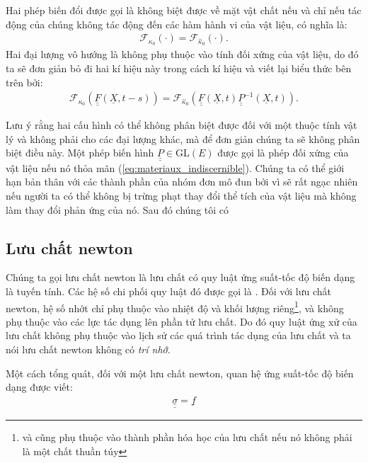 \documentclass[../../../main.tex]{subfiles}
\begin{document}
	Hai phép biến đổi được gọi là không biệt được về mặt vật chất nếu và chỉ nếu tác động của chúng không tác động đến các hàm hành vi của vật liệu, có nghĩa là:
		\begin{align}\label{eq:materiaux_indiscernible}
			\mathcal{F}_{\kappa_0}\left(\cdot\right)=\mathcal{F}_{\widehat{\kappa}_0}\left(\cdot\right).
		\end{align}
	Hai đại lượng vô hướng là không phụ thuộc vào tính đối xứng của vật liệu, do đó ta sẽ đơn giản bỏ đi hai kí hiệu này trong cách kí hiệu và viết lại biểu thức bên trên bởi:
		\begin{equation}
			\begin{aligned}
				\mathcal{F}_{\kappa_0}\left(\underline{\underline{F}}\left(\underline{X},t-s\right)\right)=\mathcal{F}_{\widehat{\kappa}_0}\left(\underline{\underline{F}}\left(\underline{X},t\right)\underline{\underline{P}}^{-1}\left(\underline{X},t\right)\right).
			\end{aligned}
		\end{equation}

	Lưu ý rằng hai cấu hình có thể không phân biệt được đối với một thuộc tính vật lý và không phải cho các đại lượng khác, mà để đơn giản chúng ta sẽ không phân biệt điều này. Một phép biến hình $\underline{\underline{P}}\in\text{GL}(E)$ được gọi là phép đối xứng của vật liệu nếu nó thỏa mãn (\ref{eq:materiaux_indiscernible}). Chúng ta có thể giới hạn bản thân với các thành phần của nhóm đơn mô đun bởi vì sẽ rất ngạc nhiên nếu người ta có thể không bị trừng phạt thay đổi thể tích của vật liệu mà không làm thay đổi phản ứng của nó. Sau đó chúng tôi có 
\subsection{Lưu chất newton}
    Chúng ta gọi lưu chất newton là lưu chất có quy luật ứng suất-tốc độ biến dạng là tuyến tính. Các hệ số chi phối quy luật đó được gọi là . Đối với lưu chất newton, hệ số nhớt chỉ phụ thuộc vào nhiệt độ và khối lượng riêng\footnote{và cũng phụ thuộc vào thành phần hóa học của lưu chất nếu nó không phải là một chất thuần túy}, và không phụ thuộc vào các lực tác dụng lên phần tử lưu chất. Do đó quy luật ứng xử của lưu chất không phụ thuộc vào lịch sử các quá trình tác dụng của lưu chất và ta nói lưu chất newton không có \emph{trí nhớ}.

    Một cách tổng quát, đối với một lưu chất newton, quan hệ ứng suất-tốc độ biến dạng được viết:
        \begin{align}
            \underline{\underline{\sigma}}=\underline{f}
        \end{align}
\end{document}
